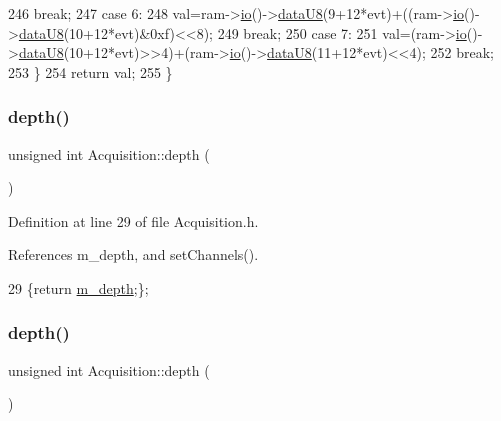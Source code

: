 \begin{DoxyCode}
246     \textcolor{keywordflow}{break};
247   \textcolor{keywordflow}{case} 6:
248     val=ram->\hyperlink{classIOobject_af04fb94137c3d86849f478ac5afab5d1}{io}()->\hyperlink{classIOdata_a75e9c318dbac3a39402179070943d4bc}{dataU8}(9+12*evt)+((ram->\hyperlink{classIOobject_af04fb94137c3d86849f478ac5afab5d1}{io}()->\hyperlink{classIOdata_a75e9c318dbac3a39402179070943d4bc}{dataU8}(10+12*evt)&0xf)<<8); 
249     \textcolor{keywordflow}{break};
250   \textcolor{keywordflow}{case} 7:
251     val=(ram->\hyperlink{classIOobject_af04fb94137c3d86849f478ac5afab5d1}{io}()->\hyperlink{classIOdata_a75e9c318dbac3a39402179070943d4bc}{dataU8}(10+12*evt)>>4)+(ram->\hyperlink{classIOobject_af04fb94137c3d86849f478ac5afab5d1}{io}()->\hyperlink{classIOdata_a75e9c318dbac3a39402179070943d4bc}{dataU8}(11+12*evt)<<4);
252     \textcolor{keywordflow}{break};
253   \}
254   \textcolor{keywordflow}{return} val;
255 \}
\end{DoxyCode}
\mbox{\label{classAcquisition_a1ad973e21a067c0de0b6264d0eb5182b}} 
\subsubsection{\texorpdfstring{depth()}{depth()}\hspace{0.1cm}{\footnotesize\ttfamily [1/2]}}
{\footnotesize\ttfamily unsigned int Acquisition\+::depth (\begin{DoxyParamCaption}{ }\end{DoxyParamCaption})\hspace{0.3cm}{\ttfamily [inline]}}



Definition at line 29 of file Acquisition.\+h.



References m\+\_\+depth, and set\+Channels().


\begin{DoxyCode}
29 \{\textcolor{keywordflow}{return} \hyperlink{classAcquisition_a26628424533a2dd74d24712a14637a72}{m\_depth};\};
\end{DoxyCode}
\mbox{\label{classAcquisition_a1ad973e21a067c0de0b6264d0eb5182b}} 
\subsubsection{\texorpdfstring{depth()}{depth()}\hspace{0.1cm}{\footnotesize\ttfamily [2/2]}}
{\footnotesize\ttfamily unsigned int Acquisition\+::depth (\begin{DoxyParamCaption}{ }\end{DoxyParamCaption})\hspace{0.3cm}{\ttfamily [inline]}}



